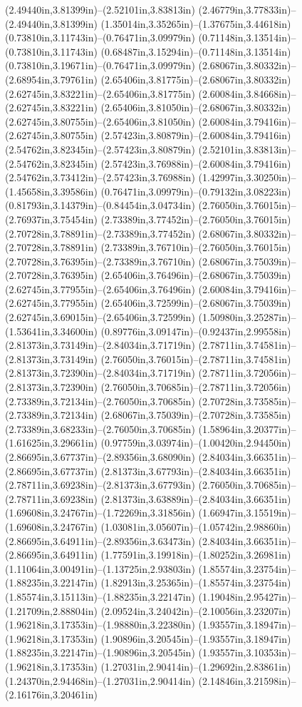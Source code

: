 (2.49440in,3.81399in)--(2.52101in,3.83813in) (2.46779in,3.77833in)--(2.49440in,3.81399in) (1.35014in,3.35265in)--(1.37675in,3.44618in) (0.73810in,3.11743in)--(0.76471in,3.09979in) (0.71148in,3.13514in)--(0.73810in,3.11743in) (0.68487in,3.15294in)--(0.71148in,3.13514in) (0.73810in,3.19671in)--(0.76471in,3.09979in) (2.68067in,3.80332in)--(2.68954in,3.79761in) (2.65406in,3.81775in)--(2.68067in,3.80332in) (2.62745in,3.83221in)--(2.65406in,3.81775in) (2.60084in,3.84668in)--(2.62745in,3.83221in) (2.65406in,3.81050in)--(2.68067in,3.80332in) (2.62745in,3.80755in)--(2.65406in,3.81050in) (2.60084in,3.79416in)--(2.62745in,3.80755in) (2.57423in,3.80879in)--(2.60084in,3.79416in) (2.54762in,3.82345in)--(2.57423in,3.80879in) (2.52101in,3.83813in)--(2.54762in,3.82345in) (2.57423in,3.76988in)--(2.60084in,3.79416in) (2.54762in,3.73412in)--(2.57423in,3.76988in) (1.42997in,3.30250in)--(1.45658in,3.39586in) (0.76471in,3.09979in)--(0.79132in,3.08223in) (0.81793in,3.14379in)--(0.84454in,3.04734in) (2.76050in,3.76015in)--(2.76937in,3.75454in) (2.73389in,3.77452in)--(2.76050in,3.76015in) (2.70728in,3.78891in)--(2.73389in,3.77452in) (2.68067in,3.80332in)--(2.70728in,3.78891in) (2.73389in,3.76710in)--(2.76050in,3.76015in) (2.70728in,3.76395in)--(2.73389in,3.76710in) (2.68067in,3.75039in)--(2.70728in,3.76395in) (2.65406in,3.76496in)--(2.68067in,3.75039in) (2.62745in,3.77955in)--(2.65406in,3.76496in) (2.60084in,3.79416in)--(2.62745in,3.77955in) (2.65406in,3.72599in)--(2.68067in,3.75039in) (2.62745in,3.69015in)--(2.65406in,3.72599in) (1.50980in,3.25287in)--(1.53641in,3.34600in) (0.89776in,3.09147in)--(0.92437in,2.99558in) (2.81373in,3.73149in)--(2.84034in,3.71719in) (2.78711in,3.74581in)--(2.81373in,3.73149in) (2.76050in,3.76015in)--(2.78711in,3.74581in) (2.81373in,3.72390in)--(2.84034in,3.71719in) (2.78711in,3.72056in)--(2.81373in,3.72390in) (2.76050in,3.70685in)--(2.78711in,3.72056in) (2.73389in,3.72134in)--(2.76050in,3.70685in) (2.70728in,3.73585in)--(2.73389in,3.72134in) (2.68067in,3.75039in)--(2.70728in,3.73585in) (2.73389in,3.68233in)--(2.76050in,3.70685in) (1.58964in,3.20377in)--(1.61625in,3.29661in) (0.97759in,3.03974in)--(1.00420in,2.94450in) (2.86695in,3.67737in)--(2.89356in,3.68090in) (2.84034in,3.66351in)--(2.86695in,3.67737in) (2.81373in,3.67793in)--(2.84034in,3.66351in) (2.78711in,3.69238in)--(2.81373in,3.67793in) (2.76050in,3.70685in)--(2.78711in,3.69238in) (2.81373in,3.63889in)--(2.84034in,3.66351in) (1.69608in,3.24767in)--(1.72269in,3.31856in) (1.66947in,3.15519in)--(1.69608in,3.24767in) (1.03081in,3.05607in)--(1.05742in,2.98860in) (2.86695in,3.64911in)--(2.89356in,3.63473in) (2.84034in,3.66351in)--(2.86695in,3.64911in) (1.77591in,3.19918in)--(1.80252in,3.26981in) (1.11064in,3.00491in)--(1.13725in,2.93803in) (1.85574in,3.23754in)--(1.88235in,3.22147in) (1.82913in,3.25365in)--(1.85574in,3.23754in) (1.85574in,3.15113in)--(1.88235in,3.22147in) (1.19048in,2.95427in)--(1.21709in,2.88804in) (2.09524in,3.24042in)--(2.10056in,3.23207in) (1.96218in,3.17353in)--(1.98880in,3.22380in) (1.93557in,3.18947in)--(1.96218in,3.17353in) (1.90896in,3.20545in)--(1.93557in,3.18947in) (1.88235in,3.22147in)--(1.90896in,3.20545in) (1.93557in,3.10353in)--(1.96218in,3.17353in) (1.27031in,2.90414in)--(1.29692in,2.83861in) (1.24370in,2.94468in)--(1.27031in,2.90414in) (2.14846in,3.21598in)--(2.16176in,3.20461in) 